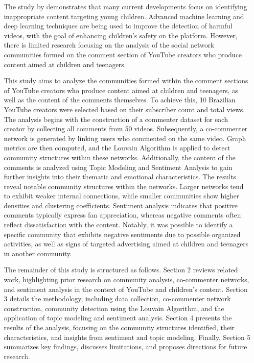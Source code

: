 \documentclass[sigconf]{acmart}
\begin{document}
The study by \cite{app13064044} demonstrates that many current developments focus on identifying
inappropriate content targeting young children. Advanced machine learning and deep learning 
techniques are being used to improve the detection of harmful videos, with the goal of enhancing 
children's safety on the platform. However, there is limited research focusing on the analysis of 
the social network communities formed on the comment section of YouTube creators who 
produce content aimed at children and teenagers.

This study aims to analyze the communities formed within the comment sections of YouTube creators who 
produce content aimed at children and teenagers, as well as the content of the comments themselves. 
To achieve this, 10 Brazilian YouTube creators were selected based on their 
subscriber count and total views. The analysis begins with the construction of a commenter dataset for 
each creator by collecting all comments from 50 videos. Subsequently, a co-commenter network is 
generated by linking users who commented on the same video. Graph metrics are then computed, and the 
Louvain Algorithm is applied to detect community structures within these networks. Additionally, the 
content of the comments is analyzed using Topic Modeling and Sentiment Analysis to gain further 
insights into their thematic and emotional characteristics. 
The results reveal notable community structures within the networks. Larger networks tend to exhibit 
weaker internal connections, while smaller communities show higher densities and clustering coefficients. 
Sentiment analysis indicates that positive comments typically express fan appreciation, whereas negative 
comments often reflect dissatisfaction with the content. 
Notably, it was possible to identify a specific community that exhibits negative sentiments due 
to possible organized activities, as well as signs of targeted advertising aimed at children and teenagers 
in another community. 

The remainder of this study is structured as follows. Section 2 reviews related work, highlighting 
prior research on community analysis, co-commenter networks, and sentiment analysis in the context 
of YouTube and children's content. Section 3 details the methodology, including data collection, 
co-commenter network construction, community detection using the Louvain Algorithm, and the application 
of topic modeling and sentiment analysis. Section 4 presents the results of the analysis, focusing 
on the community structures identified, their characteristics, and insights from sentiment and topic 
modeling. Finally, Section 5 summarizes key findings, discusses limitations, and proposes directions for 
future research.
\end{document}
